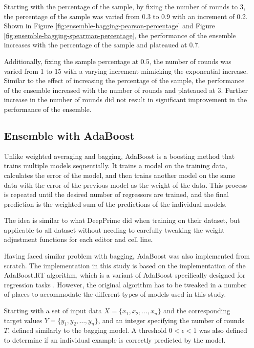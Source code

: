 Starting with the percentage of the sample, by fixing the number of rounds to 3, the percentage of the sample was varied from 0.3 to 0.9 with an increment of 0.2. Shown in Figure \ref{fig:ensemble-bagging-pearson-percentage} and Figure \ref{fig:ensemble-bagging-spearman-percentage}, the performance of the ensemble increases with the percentage of the sample and plateaued at 0.7. 

Additionally, fixing the sample percentage at 0.5, the number of rounds was varied from 1 to 15 with a varying increment mimicking the exponential increase. Similar to the effect of increasing the percentage of the sample, the performance of the ensemble increased with the number of rounds and plateaued at 3. Further increase in the number of rounds did not result in significant improvement in the performance of the ensemble.

\subsection{Ensemble with AdaBoost}

Unlike weighted averaging and bagging, AdaBoost is a boosting method that trains multiple models sequentially. It trains a model on the training data, calculates the error of the model, and then trains another model on the same data with the error of the previous model as the weight of the data. This process is repeated until the desired number of regressors are trained, and the final prediction is the weighted sum of the predictions of the individual models. 

The idea is similar to what DeepPrime did when training on their dataset, but applicable to all dataset without needing to carefully tweaking the weight adjustment functions for each editor and cell line.

Having faced similar problem with bagging, AdaBoost was also implemented from scratch. The implementation in this study is based on the implementation of the AdaBoost.RT algorithm, which is a variant of AdaBoost specifically designed for regression tasks \cite{shresthaExperimentsAdaBoostRT2006,solomatineAdaBoostRTBoosting2004}. However, the original algorithm has to be tweaked in a number of places to accommodate the different types of models used in this study. 

Starting with a set of input data $X=\{x_1, x_2, ..., x_n\}$ and the corresponding target values $Y=\{y_1, y_2, ..., y_n\}$, and an integer specifying the number of rounds $T$, defined similarly to the bagging model. A threshold $0<\epsilon < 1$ was also defined to determine if an individual example is correctly predicted by the model.

